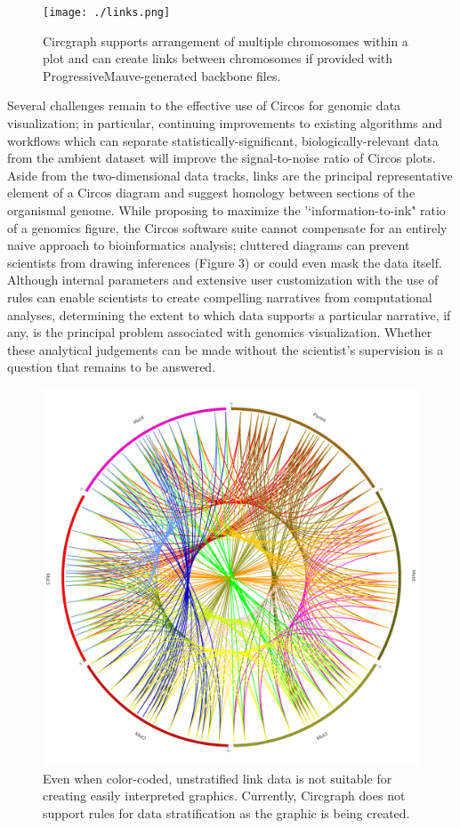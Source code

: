 \documentclass[twocolumn]{article}
\begin{document}
\begin{figure}
\centering
\texttt{[image: ./links.png]}
\caption{Circgraph supports arrangement of multiple chromosomes within a plot and can create links between chromosomes if provided with ProgressiveMauve-generated backbone files.}
\end{figure}

Several challenges remain to the effective use of Circos for genomic data visualization; in particular, continuing improvements to existing algorithms and workflows which can separate statistically-significant, biologically-relevant data from the ambient dataset will improve the signal-to-noise ratio of Circos plots. Aside from the two-dimensional data tracks, links are the principal representative element of a Circos diagram and suggest homology between sections of the organismal genome. While proposing to maximize the '`information-to-ink" ratio of a genomics figure, the Circos software suite cannot compensate for an entirely naive approach to bioinformatics analysis; cluttered diagrams can prevent scientists from drawing inferences (Figure 3) or could even mask the data itself. Although internal parameters and extensive user customization with the use of rules can enable scientists to create compelling narratives from computational analyses, determining the extent to which data supports a particular narrative, if any, is the principal problem associated with genomics visualization. Whether these analytical judgements can be made without the scientist's supervision is a question that remains to be answered.

\begin{figure}
\centering
\includegraphics[scale=0.1]{./Generated_Data_Non_Ribbon.png}
\caption{Even when color-coded, unstratified link data is not suitable for creating easily interpreted graphics. Currently, Circgraph does not support rules for data stratification as the graphic is being created.}
\end{figure}
\end{document}
